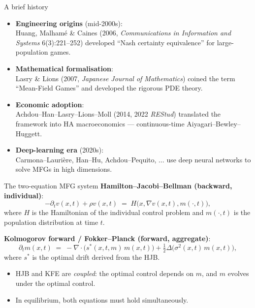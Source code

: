 \begin{frame}{A brief history}
\begin{itemize}
\item \textbf{Engineering origins} (mid-2000s):\\
  Huang, Malham\'e \& Caines (2006, \emph{Communications in Information and Systems} 6(3):221--252) developed ``Nash certainty equivalence'' for large-population games.
\medskip
\item \textbf{Mathematical formalisation}:\\
  Lasry \& Lions (2007, \emph{Japanese Journal of Mathematics}) coined the term ``Mean-Field Games'' and developed the rigorous PDE theory.
\medskip
\item \textbf{Economic adoption}:\\
  Achdou--Han--Lasry--Lions--Moll (2014, 2022 \emph{REStud}) translated the framework into HA macroeconomics --- continuous-time Aiyagari--Bewley--Huggett.
\medskip
\item \textbf{Deep-learning era} (2020s):\\
  Carmona--Lauri\`ere, Han--Hu, Achdou--Pequito, $\ldots$ use deep neural networks to solve MFGs in high dimensions.
\end{itemize}
\end{frame}

\begin{frame}{The two-equation MFG system}
\textbf{Hamilton--Jacobi--Bellman (backward, individual)}:
\[
-\partial_t v(x,t) + \rho v(x,t) \;=\; H\!\big(x,\nabla v(x,t),m(\cdot,t)\big),
\]
where $H$ is the Hamiltonian of the individual control problem and $m(\cdot,t)$ is the population distribution at time $t$.
\medskip

\textbf{Kolmogorov forward / Fokker--Planck (forward, aggregate)}:
\[
\partial_t m(x,t) \;=\; -\nabla\!\cdot\!\big(s^*(x,t,m)\, m(x,t)\big) + \tfrac{1}{2}\Delta\!\big(\sigma^2(x,t)\,m(x,t)\big),
\]
where $s^*$ is the optimal drift derived from the HJB.
\medskip
\begin{itemize}
\item HJB and KFE are \emph{coupled}: the optimal control depends on $m$, and $m$ evolves under the optimal control.
\item In equilibrium, both equations must hold simultaneously.
\end{itemize}
\end{frame}

